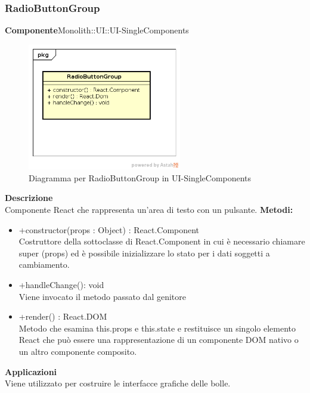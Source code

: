 \clearpage

\subsubsection{RadioButtonGroup}
\textbf{Componente}Monolith::UI::UI-SingleComponents\\
   \FloatBarrier
   \begin{figure}[ht]
   \centering
   \includegraphics[width=0.6\textwidth]{img/single-RadioButtonGroup}
   \caption{{Diagramma per RadioButtonGroup in UI-SingleComponents}}
\end{figure}
\FloatBarrier
\textbf{Descrizione}\\
Componente React che rappresenta un'area di testo con un pulsante.
\textbf{Metodi:} \begin{itemize}\item +constructor(props : Object) : React.Component \\Costruttore della sottoclasse di React.Component in cui è necessario chiamare super (props) ed è possibile inizializzare lo stato per i dati soggetti a cambiamento.\item +handleChange(): void \\Viene invocato il metodo passato dal genitore\item +render() : React.DOM \\Metodo che esamina this.props e this.state e restituisce un singolo elemento React che può essere una rappresentazione di un componente DOM nativo o un altro componente composito.\end{itemize} 


\textbf{Applicazioni}\\
Viene utilizzato per costruire le interfacce grafiche delle bolle. 


\clearpage

